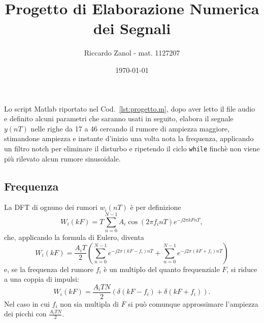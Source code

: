 \documentclass{article}
\title{Progetto di Elaborazione Numerica dei Segnali}
\author{Riccardo Zanol - mat. 1127207}
\date{\today}
\newcommand{\cod}[1]{Cod.~\ref{#1}}
\newcommand{\inlcd}[1]{\lstinline[basicstyle=\ttfamily,keywordstyle={}]{#1}}
\begin{document}
\maketitle

Lo script Matlab riportato nel \cod{lst:progetto.m}, dopo aver letto
il file audio e definito alcuni parametri che saranno usati in
seguito, elabora il segnale $y(nT)$ nelle righe da 17 a 46 cercando il
rumore di ampiezza maggiore, stimandone ampiezza e instante d'inizio
una volta nota la frequenza, applicando un filtro notch per eliminare
il disturbo e ripetendo il ciclo \inlcd{while} finchè non viene più
rilevato alcun rumore sinusoidale.

\subsection{Frequenza}
\label{sec:freq}
La DFT di ognuno dei rumori $w_i(nT)$ è per definizione
\begin{equation}
  W_i(kF) = T \sum_{n=0}^{N-1}A_i\cos(2\pi f_i nT)e^{-j2\pi kF nT},
\end{equation}
che, applicando la formula di Eulero, diventa
\begin{equation}
  W_i(kF) = \frac{A_iT}{2} \left(
  \sum_{n=0}^{N-1}e^{-j2\pi (kF-f_i) nT} +
  \sum_{n=0}^{N-1}e^{-j2\pi (kF+f_i) nT}
  \right)
\end{equation}
e, se la frequenza del rumore $f_i$ è un multiplo del quanto
frequenziale $F$, si riduce a una coppia di impulsi:
\begin{equation}
  W_i(kF) = \frac{A_iTN}{2} \left( \delta(kF - f_i) + \delta(kF + f_i) \right).
  \label{eq:W}
\end{equation}
Nel caso in cui $f_i$ non sia multipla di $F$ si può comunque
approssimare l'ampiezza dei picchi con $\frac{A_iTN}{2}$.
\end{document}
